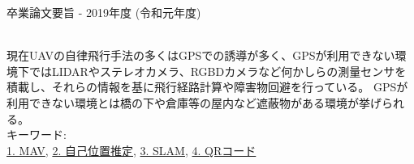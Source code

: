 卒業論文要旨 - 2019年度 (令和元年度)
\begin{center}
\begin{large}
\end{large}
\end{center}
~ \\
現在UAVの自律飛行手法の多くはGPSでの誘導が多く、GPSが利用できない環境下ではLIDARやステレオカメラ、RGBDカメラなど何かしらの測量センサを積載し、それらの情報を基に飛行経路計算や障害物回避を行っている。  
GPSが利用できない環境とは橋の下や倉庫等の屋内など遮蔽物がある環境が挙げられる。  
~ \\
キーワード:\\
\underline{1. MAV},
\underline{2. 自己位置推定},
\underline{3. SLAM},
\underline{4. QRコード}
\begin{flushright}
\dept \\
\author
\end{flushright}
